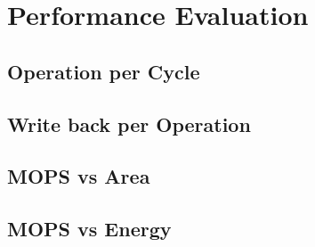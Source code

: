 \chapter{Performance Evaluation}
    \section{Operation per Cycle}
    \section{Write back per Operation}
    \section{MOPS vs Area}
    \section{MOPS vs Energy}


